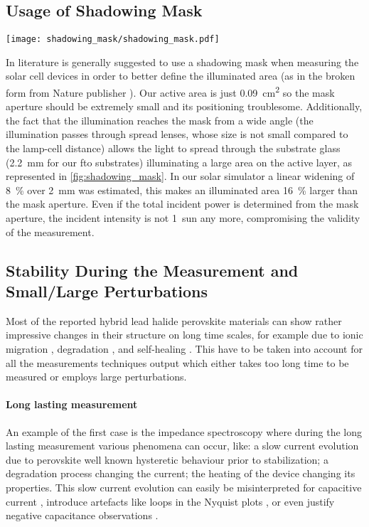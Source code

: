 	\subsection{Usage of Shadowing Mask}

		\begin{SCfigure}
			\centering
			\texttt{[image: shadowing\_mask/shadowing\_mask.pdf]}
			\label{fig:shadowing_mask}
		\end{SCfigure}

		In literature is generally suggested to use a shadowing mask when measuring the solar cell devices in order to better define the illuminated area (as in the broken \cite{Brinser2017} form from Nature publisher \cite{NatureResearch2017}).
		Our active area is just \SI{0.09}{\square\cm} so the mask aperture should be extremely small and its positioning troublesome.
		Additionally, the fact that the illumination reaches the mask from a wide angle (the illumination passes through spread lenses, whose size is not small compared to the lamp-cell distance) allows the light to spread through the substrate glass (\SI{2.2}{\mm} for our \gls{fto} substrates) illuminating a large area on the active layer, as represented in \cref{fig:shadowing_mask}.
		In our solar simulator a linear widening of 8~\% over \SI{2}{\mm} was estimated, this makes an illuminated area 16~\% larger than the mask aperture.
		Even if the total incident power is determined from the mask aperture, the incident intensity is not 1~sun any more, compromising the validity of the measurement.


	\subsection{Stability During the Measurement and Small/Large Perturbations}

		Most of the reported hybrid lead halide perovskite materials can show rather impressive changes in their structure on long time scales, for example due to ionic migration \cite{Calado2016}, degradation \cite{OKane2019}, and self-healing \cite{Ceratti2018}.
		This have to be taken into account for all the measurements techniques output which either takes too long time to be measured or employs large perturbations.

		\paragraph{Long lasting measurement}
		An example of the first case is the impedance spectroscopy where during the long lasting measurement various phenomena can occur, like: a slow current evolution due to perovskite well known hysteretic behaviour prior to stabilization; a degradation process changing the current; the heating of the device changing its properties.
		This slow current evolution can easily be misinterpreted for capacitive current \cite{Jacobs2018}, introduce artefacts like loops in the Nyquist plots \cite{Moia2019}, or even justify negative capacitance observations \cite{Knapp2015}.

